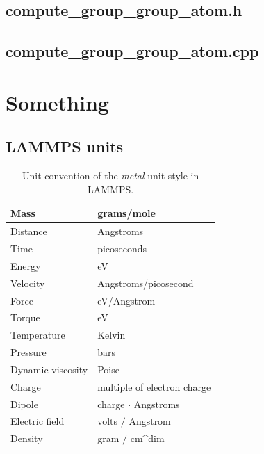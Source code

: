 \documentclass[twoside,english]{uiofysmaster}
\begin{document}
\newpage
\section{compute\_group\_group\_atom.h}



\newpage
\section{compute\_group\_group\_atom.cpp}



\chapter{Something}
\section{LAMMPS units}

\begin{table}[H]
	\begin{center}
		\caption{Unit convention of the \textit{metal} unit style in LAMMPS.}
		\begin{tabularx}{0.8\textwidth}{  @{\hspace{2em}} @{}XX@{} @{\hspace{2em}} }
			\toprule
			Mass 					   & grams/mole\\ 
			\midrule
			Distance 		   		  & Angstroms\\
			\midrule
			Time 				 		& picoseconds\\
			\midrule
			Energy 			   		  & eV\\
			\midrule
			Velocity 		   		  & Angstroms/picosecond\\
			\midrule
			Force 			    	   & eV/Angstrom\\
			\midrule
			Torque 			    	  & eV\\
			\midrule
			Temperature    		  & Kelvin\\
			\midrule
			Pressure 		 		 & bars\\
			\midrule
			Dynamic viscosity & Poise\\
			\midrule
			Charge 					 & multiple of electron charge\\
			\midrule
			Dipole 					 & charge $\cdot$ Angstroms\\
			\midrule
			Electric field 		    & volts $/$ Angstrom\\
			\midrule
			Density 				& gram $/$ cm\^{}dim\\
			\bottomrule
		\end{tabularx}
		\label{tab:unitsMetal}
	\end{center}
\end{table}









\end{document}
